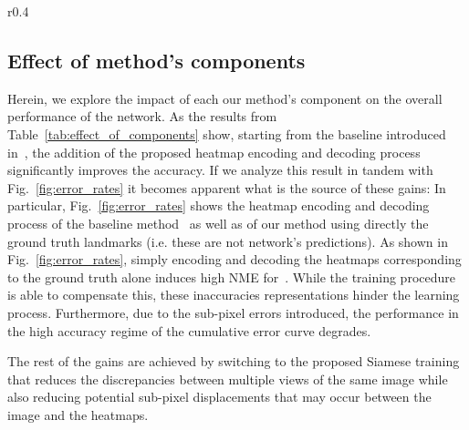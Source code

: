 \documentclass{bmvc2k}
\begin{document}
\begin{wraptable}[9]{r}{0.4\textwidth}
\vspace{-0.3cm}
\centering
    \caption{Effect of the proposed components on the WFLW dataset.}
    \label{tab:effect_of_components}
\end{wraptable}


\vspace{-10px}
\subsection{Effect of method's components}\label{ssec:effect-component}

Herein, we explore the impact of each our method's component on the overall performance of the network. As the results from Table~\ref{tab:effect_of_components} show, starting from the baseline introduced in~\cite{bulat2017far}, the addition of the proposed heatmap encoding and decoding process significantly improves the accuracy. If we analyze this result in tandem with Fig.~\ref{fig:error_rates} it becomes apparent what is the source of these gains: In particular, Fig.~\ref{fig:error_rates} shows the heatmap encoding and decoding process of the baseline method~\cite{bulat2017far} as well as of our method using directly the ground truth landmarks (i.e. these are not network's predictions). As shown in Fig.~\ref{fig:error_rates}, simply encoding and decoding the heatmaps corresponding to the ground truth alone induces high NME for~\cite{bulat2017far}. While the training procedure is able to compensate this, these inaccuracies representations hinder the learning process. Furthermore, due to the sub-pixel errors introduced, the performance in the high accuracy regime of the cumulative error curve degrades.

The rest of the gains are achieved by switching to the proposed Siamese training that reduces the discrepancies between multiple views of the same image while also reducing potential sub-pixel displacements that may occur between the image and the heatmaps.
\vspace{-10px}
\end{document}
